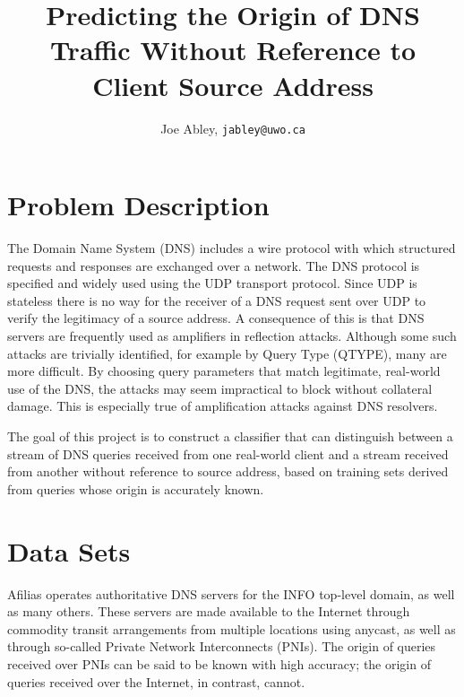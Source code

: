 \documentclass[9pt,letterpaper,twocolumn]{scrartcl}
\begin{document}
\titlehead{{\Large Western University \hfill ECE 9603\\}
  Electrical and Computer Engineering \hfill Fall 2018}
\subject{Project Proposal}
\title{Predicting the Origin of DNS Traffic Without Reference to Client Source Address}
\author{Joe Abley, \texttt{jabley@uwo.ca}}

\maketitle


\section{Problem Description}
The Domain Name System (DNS) includes a wire protocol with which
structured requests and responses are exchanged over a network. The
DNS protocol is specified and widely used using the UDP transport
protocol.  Since UDP is stateless there is no way for the receiver
of a DNS request sent over UDP to verify the legitimacy of a source
address.  A consequence of this is that DNS servers are frequently
used as amplifiers in reflection attacks\cite{RFC5358}. Although
some such attacks are trivially identified, for example by Query
Type (QTYPE), many are more difficult.  By choosing query parameters
that match legitimate, real-world use of the DNS, the attacks may
seem impractical to block without collateral damage. This is
especially true of amplification attacks against DNS resolvers.

The goal of this project is to construct a classifier that can
distinguish between a stream of DNS queries received from one
real-world client and a stream received from another without reference
to source address, based on training sets derived from queries whose
origin is accurately known.

\section{Data Sets}
Afilias operates authoritative DNS servers for the INFO top-level
domain, as well as many others. These servers are made available
to the Internet through commodity transit arrangements from multiple
locations using anycast\cite{RFC4786}, as well as through so-called
Private Network Interconnects (PNIs). The origin of queries received
over PNIs can be said to be known with high accuracy; the origin
of queries received over the Internet, in contrast, cannot.
\end{document}
